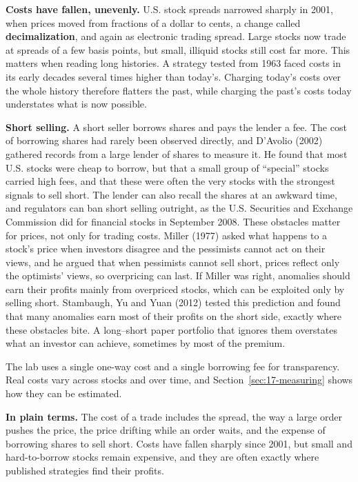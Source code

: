 \textbf{Costs have fallen, unevenly.} U.S. stock spreads narrowed sharply in 2001, when prices moved from fractions of a dollar to cents, a change called \textbf{decimalization}, and again as electronic trading spread. Large stocks now trade at spreads of a few basis points, but small, illiquid stocks still cost far more. This matters when reading long histories. A strategy tested from 1963 faced costs in its early decades several times higher than today's. Charging today's costs over the whole history therefore flatters the past, while charging the past's costs today understates what is now possible.

\textbf{Short selling.} A short seller borrows shares and pays the lender a fee. The cost of borrowing shares had rarely been observed directly, and D'Avolio (2002) gathered records from a large lender of shares to measure it. He found that most U.S. stocks were cheap to borrow, but that a small group of ``special'' stocks carried high fees, and that these were often the very stocks with the strongest signals to sell short. The lender can also recall the shares at an awkward time, and regulators can ban short selling outright, as the U.S. Securities and Exchange Commission did for financial stocks in September 2008. These obstacles matter for prices, not only for trading costs. Miller (1977) asked what happens to a stock's price when investors disagree and the pessimists cannot act on their views, and he argued that when pessimists cannot sell short, prices reflect only the optimists' views, so overpricing can last. If Miller was right, anomalies should earn their profits mainly from overpriced stocks, which can be exploited only by selling short. Stambaugh, Yu and Yuan (2012) tested this prediction and found that many anomalies earn most of their profits on the short side, exactly where these obstacles bite. A long--short paper portfolio that ignores them overstates what an investor can achieve, sometimes by most of the premium.

The lab uses a single one-way cost and a single borrowing fee for transparency. Real costs vary across stocks and over time, and Section~\ref{sec:17-measuring} shows how they can be estimated.

\noindent\textbf{In plain terms.} The cost of a trade includes the spread, the way a large order pushes the price, the price drifting while an order waits, and the expense of borrowing shares to sell short. Costs have fallen sharply since 2001, but small and hard-to-borrow stocks remain expensive, and they are often exactly where published strategies find their profits.

